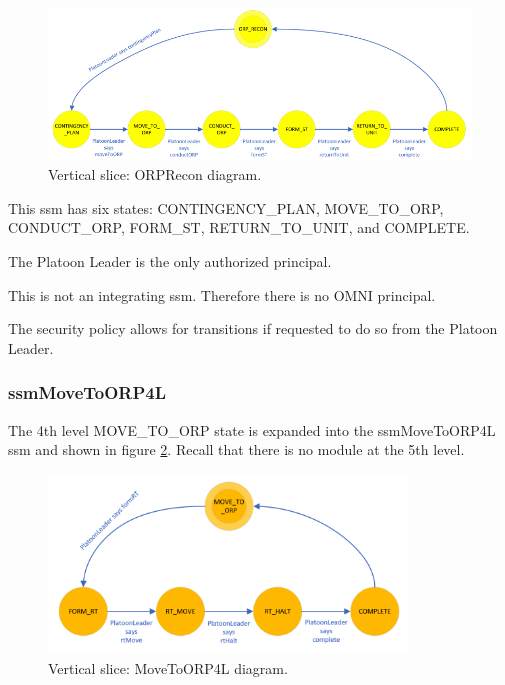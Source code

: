 \documentclass[../../main/main.tex]{subfiles}
\begin{document}
\begin{figure}[h!]
\centering
\includegraphics[width=\textwidth]{../figures/ssmORPReconDiagram}
\caption{\label{ssmORPReconDiagram} Vertical slice: ORPRecon diagram.}
\end{figure}

This \gls{ssm} has six states: CONTINGENCY_PLAN, MOVE_TO_ORP, CONDUCT_ORP, FORM_ST, RETURN_TO_UNIT, and COMPLETE.  

The Platoon Leader is the only authorized principal.

This is not an integrating \gls{ssm}.  Therefore there is no OMNI principal.  

The security policy allows for transitions if requested to do so from the Platoon Leader.  

\clearpage
\subsubsection{ssmMoveToORP4L}\label{sssec:ssmMoveToORP4L}
The 4th level MOVE_TO_ORP state is expanded into the ssmMoveToORP4L \gls{ssm} and shown in figure \ref{moveToORP4LDiagram}.  Recall that there is no module at the 5th level.  

\begin{figure}[h!]
\centering
\includegraphics[width=0.85\textwidth]{../figures/moveToORP4LDiagram}
\caption{\label{moveToORP4LDiagram} Vertical slice: MoveToORP4L diagram.}
\end{figure}
\end{document}
